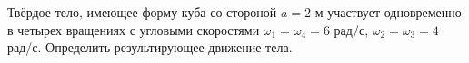 Твёрдое тело, имеющее форму куба со стороной $a=2$ м 
участвует одновременно в четырех вращениях
с угловыми скоростями $\omega_{1}=\omega_{4}=6$ рад/с,
$\omega_{2}=\omega_{3}=4$ рад/с.
Определить результирующее движение тела.
